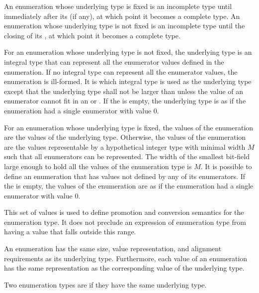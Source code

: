 \pnum
An enumeration whose underlying type is fixed is an incomplete type
until immediately after its
 (if any), at which point it becomes a complete type.
An enumeration whose underlying type is not fixed is an incomplete type
until the closing \tcode{\}} of its
, at which point it becomes a complete type.

\pnum
For an enumeration whose underlying type is not fixed,
the underlying type
is an
integral type that can represent all the enumerator values defined in
the enumeration. If no integral type can represent all the enumerator
values, the enumeration is ill-formed. It is 
which integral type is used as the underlying type
except that the underlying type shall not be larger than 
unless the value of an enumerator cannot fit in an  or
. If the  is empty, the
underlying type is as if the enumeration had a single enumerator with
value 0.

\pnum
{}%
For an enumeration whose underlying type is fixed, the values of
the enumeration are the values of the underlying type. Otherwise,
the values of the enumeration are the values representable by
a hypothetical integer type with minimal width $M$
such that all enumerators can be represented.
The width of the smallest bit-field large enough to hold all the values of the
enumeration type is $M$.
It is possible to define an enumeration that has values not defined by
any of its enumerators. If the  is empty, the
values of the enumeration are as if the enumeration had a single enumerator with
value 0.
\begin{footnote}
This set of values is used to define promotion and
conversion semantics for the enumeration type. It does not preclude an
expression of enumeration type from having a value that falls outside
this range.
\end{footnote}

\pnum
An enumeration has
the same size,
value representation, and
alignment requirements
as its underlying type.
Furthermore, each value of an enumeration has the same representation
as the corresponding value of the underlying type.

\pnum
Two enumeration types are 
if they have the same underlying type.

